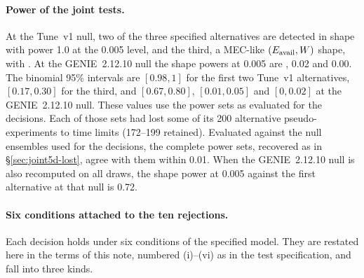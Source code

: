 \paragraph{Power of the joint tests.} At the Tune~v1 null, two of the three specified alternatives are detected in shape with power 1.0 at the 0.005 level, and the third, a MEC-like $(E_{\mathrm{avail}},W)$ shape, with \jtPowPthree. At the GENIE~2.12.10 null the shape powers at 0.005 are \jtPowPonegShape, 0.02 and 0.00. The binomial 95\% intervals are $[0.98,1]$ for the first two Tune~v1 alternatives, $[0.17,0.30]$ for the third, and $[0.67,0.80]$, $[0.01,0.05]$ and $[0,0.02]$ at the GENIE~2.12.10 null. These values use the power sets as evaluated for the decisions. Each of those sets had lost some of its 200 alternative pseudo-experiments to time limits (172--199 retained). Evaluated against the null ensembles used for the decisions, the complete power sets, recovered as in \S\ref{sec:joint5d-lost}, agree with them within 0.01. When the GENIE~2.12.10 null is also recomputed on all draws, the shape power at 0.005 against the first alternative at that null is 0.72.

\paragraph{Six conditions attached to the ten rejections.} Each decision holds under six conditions of the specified model. They are restated here in the terms of this note, numbered (i)--(vi) as in the test specification, and fall into three kinds.

